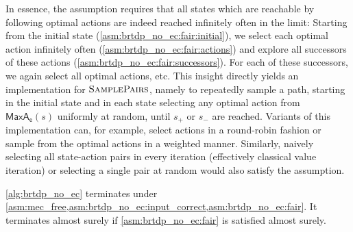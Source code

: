 \documentclass{article}
\newcommand{\targetstate}{s_+}
\newcommand{\sinkstate}{s_-}
\newcommand{\samplepath}{\textsc{SamplePairs}}
\newcommand{\algoepisode}{\mathsf{e}}
\newcommand{\umaxactions}{\mathsf{MaxA}}
\begin{document}
In essence, the assumption requires that all states which are reachable by following optimal actions are indeed reached infinitely often in the limit:
Starting from the initial state (\cref{asm:brtdp_no_ec:fair:initial}), we select each optimal action infinitely often (\cref{asm:brtdp_no_ec:fair:actions}) and explore all successors of these actions (\cref{asm:brtdp_no_ec:fair:successors}).
For each of these successors, we again select all optimal actions, etc.
This insight directly yields an implementation for $\samplepath$, namely to repeatedly sample a path, starting in the initial state and in each state selecting any optimal action from $\umaxactions_\algoepisode(s)$ uniformly at random, until $\targetstate$ or $\sinkstate$ are reached.
Variants of this implementation can, for example, select actions in a round-robin fashion or sample from the optimal actions in a weighted manner.
Similarly, naively selecting all state-action pairs in every iteration (effectively classical value iteration) or selecting a single pair at random would also satisfy the assumption.
\begin{lemma} \label{stm:brtdp:no_ec:termination}
	\cref{alg:brtdp_no_ec} terminates under \cref{asm:mec_free,asm:brtdp_no_ec:input_correct,asm:brtdp_no_ec:fair}.
	It terminates almost surely if \cref{asm:brtdp_no_ec:fair} is satisfied almost surely.
\end{lemma}
\end{document}
